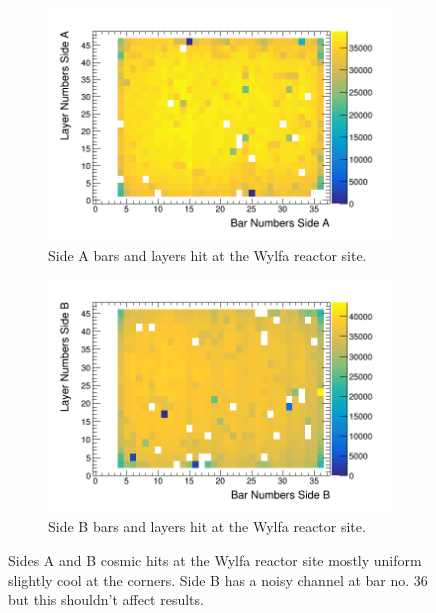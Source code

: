 \documentclass[12pt,a4paper]{article}
\begin{document}
\begin{figure}[H]
\centering
\begin{subfigure}{.5\textwidth}
  \centering
  \includegraphics[width=\linewidth]{sidesAB/sideABarsAndLayersWylfa.png}
  \captionsetup{width=.9\linewidth}
  \caption{Side A bars and layers hit at the Wylfa reactor site.}
  \label{subFig:pvtLiverpool}
\end{subfigure}%
\begin{subfigure}{.5\textwidth}
  \centering
  \includegraphics[width=\linewidth]{sidesAB/sideBBarsAndLayersWylfa.png}
  \captionsetup{width=.9\linewidth}
  \caption{Side B bars and layers hit at the Wylfa reactor site.}
  \label{subFig:pvtWylfa}
\end{subfigure}
\caption{Sides A and B cosmic hits at the Wylfa reactor site mostly uniform slightly cool at the corners. Side B has a noisy channel at bar no. 36 but this shouldn't affect results.}
\label{fig:pvtWylfaAndLiverpool}
\end{figure}

% 
%
\printbibliography
\end{document}
